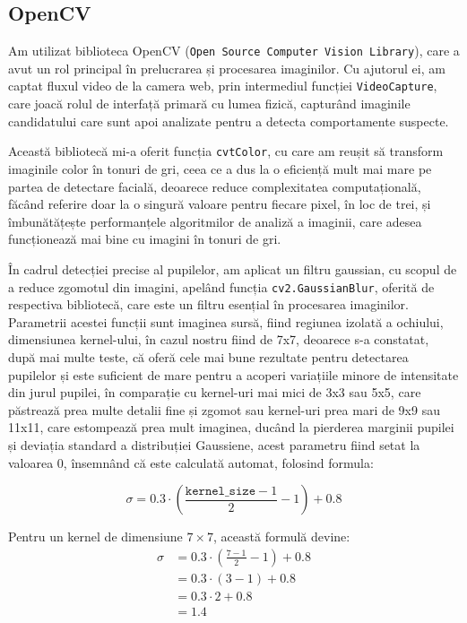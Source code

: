 \documentclass[12pt,a4paper]{article}
\begin{document}
\subsection{OpenCV}
Am utilizat biblioteca OpenCV (\texttt{Open Source Computer Vision Library}),
care a avut un rol principal în prelucrarea și procesarea imaginilor\cite{opencv}. Cu
ajutorul ei, am captat fluxul video de la camera web, prin intermediul
funcției \texttt{VideoCapture}, care joacă rolul de interfață primară cu lumea
fizică, capturând imaginile candidatului care sunt apoi analizate pentru
a detecta comportamente suspecte.

Această bibliotecă mi-a oferit funcția \texttt{cvtColor}, cu care am reușit să
transform imaginile color în tonuri de gri, ceea ce a dus la o eficiență
mult mai mare pe partea de detectare facială, deoarece reduce
complexitatea computațională, făcând referire doar la o singură valoare
pentru fiecare pixel, în loc de trei, și îmbunătățește performanțele
algoritmilor de analiză a imaginii, care adesea funcționează mai bine cu
imagini în tonuri de gri.

În cadrul detecției precise al pupilelor, am aplicat un filtru gaussian,
cu scopul de a reduce zgomotul din imagini, apelând funcția
\texttt{cv2.GaussianBlur}, oferită de respectiva bibliotecă, care este un filtru
esențial în procesarea imaginilor. Parametrii acestei funcții sunt
imaginea sursă, fiind regiunea izolată a ochiului, dimensiunea
kernel-ului, în cazul nostru fiind de 7x7, deoarece s-a constatat, după
mai multe teste, că oferă cele mai bune rezultate pentru detectarea
pupilelor și este suficient de mare pentru a acoperi variațiile minore
de intensitate din jurul pupilei, în comparație cu kernel-uri mai mici
de 3x3 sau 5x5, care păstrează prea multe detalii fine și zgomot sau
kernel-uri prea mari de 9x9 sau 11x11, care estompează prea mult
imaginea, ducând la pierderea marginii pupilei și deviația standard a
distribuției Gaussiene, acest parametru fiind setat la valoarea 0,
însemnând că este calculată automat, folosind formula:

\begin{equation}
\sigma = 0.3 \cdot \left( \frac{\texttt{kernel\_size} - 1}{2} - 1 \right) + 0.8
\end{equation}

Pentru un kernel de dimensiune \(7 \times 7\), această formulă devine:
\begin{align}
\sigma &= 0.3 \cdot \left( \frac{7 - 1}{2} - 1 \right) + 0.8 \nonumber \\
    &= 0.3 \cdot (3 - 1) + 0.8 \nonumber \\
    &= 0.3 \cdot 2 + 0.8 \nonumber \\
    &= 1.4
\end{align}
\end{document}
